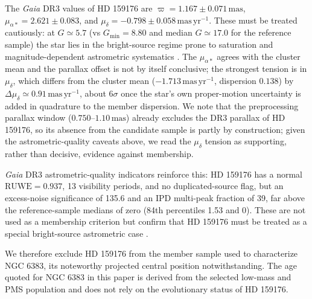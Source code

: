 \documentclass{aa}
\begin{document}
The \textit{Gaia} DR3 values of HD 159176 are $\varpi = 1.167 \pm 0.071\,\mathrm{mas}$, $\mu_{\alpha*}=2.621 \pm 0.083$, and $\mu_{\delta}=-0.798 \pm 0.058\,\mathrm{mas\,yr^{-1}}$. These must be treated cautiously: at $G\simeq5.7$ (vs $G_{\min}=8.80$ and median $G\simeq17.0$ for the reference sample) the star lies in the bright-source regime prone to saturation and magnitude-dependent astrometric systematics \citep{2021A&A...649A...2L,2021A&A...649A...4L,2021A&A...649A.124C,2022A&A...657A.130M}. The $\mu_{\alpha*}$ agrees with the cluster mean and the parallax offset is not by itself conclusive; the strongest tension is in $\mu_{\delta}$, which differs from the cluster mean ($-1.713\,\mathrm{mas\,yr^{-1}}$, dispersion $0.138$) by $\Delta\mu_{\delta}\simeq0.91\,\mathrm{mas\,yr^{-1}}$, about $6\sigma$ once the star's own proper-motion uncertainty is added in quadrature to the member dispersion. We note that the preprocessing parallax window ($0.750$--$1.10\,\mathrm{mas}$) already excludes the DR3 parallax of HD 159176, so its absence from the candidate sample is partly by construction; given the astrometric-quality caveats above, we read the $\mu_{\delta}$ tension as supporting, rather than decisive, evidence against membership.

\textit{Gaia} DR3 astrometric-quality indicators reinforce this: HD 159176 has a normal $\mathrm{RUWE}=0.937$, 13 visibility periods, and no duplicated-source flag, but an excess-noise significance of 135.6 and an IPD multi-peak fraction of 39, far above the reference-sample medians of zero (84th percentiles 1.53 and 0). These are not used as a membership criterion but confirm that HD 159176 must be treated as a special bright-source astrometric case \citep{2022MNRAS.510.2597R}.

We therefore exclude HD 159176 from the member sample used to characterize NGC 6383, its noteworthy projected central position notwithstanding. The age quoted for NGC 6383 in this paper is derived from the selected low-mass and PMS population and does not rely on the evolutionary status of HD 159176.
\end{document}
